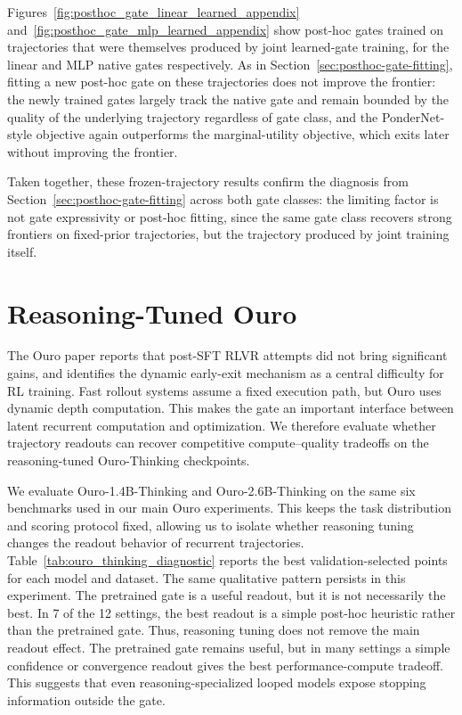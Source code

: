 \documentclass[10pt]{article} %
\begin{document}
Figures~\ref{fig:posthoc_gate_linear_learned_appendix} and~\ref{fig:posthoc_gate_mlp_learned_appendix} show post-hoc gates trained on trajectories that were themselves produced by joint learned-gate training, for the linear and MLP native gates respectively. As in Section~\ref{sec:posthoc-gate-fitting}, fitting a new post-hoc gate on these trajectories does not improve the frontier: the newly trained gates largely track the native gate and remain bounded by the quality of the underlying trajectory regardless of gate class, and the PonderNet-style objective again outperforms the marginal-utility objective, which exits later without improving the frontier.

Taken together, these frozen-trajectory results confirm the diagnosis from Section~\ref{sec:posthoc-gate-fitting} across both gate classes: the limiting factor is not gate expressivity or post-hoc fitting, since the same gate class recovers strong frontiers on fixed-prior trajectories, but the trajectory produced by joint training itself.

\section{Reasoning-Tuned Ouro}
\label{app:ouro_thinking}

The Ouro paper reports that post-SFT RLVR attempts did not bring significant gains, and identifies the dynamic early-exit mechanism as a central difficulty for RL training. Fast rollout systems assume a fixed execution path, but Ouro uses dynamic depth computation. This makes the gate an important interface between latent recurrent computation and optimization. We therefore evaluate whether trajectory readouts can recover competitive compute--quality tradeoffs on the reasoning-tuned Ouro-Thinking checkpoints.

We evaluate Ouro-1.4B-Thinking and Ouro-2.6B-Thinking on the same six benchmarks used in our main Ouro experiments. This keeps the task distribution and scoring protocol fixed, allowing us to isolate whether reasoning tuning changes the readout behavior of recurrent trajectories. Table~\ref{tab:ouro_thinking_diagnostic} reports the best validation-selected points for each model and dataset. The same qualitative pattern persists in this experiment. The pretrained gate is a useful readout, but it is not necessarily the best. In 7 of the 12 settings, the best readout is a simple post-hoc heuristic rather than the pretrained gate. Thus, reasoning tuning does not remove the main readout effect. The pretrained gate remains useful, but in many settings a simple confidence or convergence readout gives the best performance-compute tradeoff. This suggests that even reasoning-specialized looped models expose stopping information outside the gate.
\end{document}
